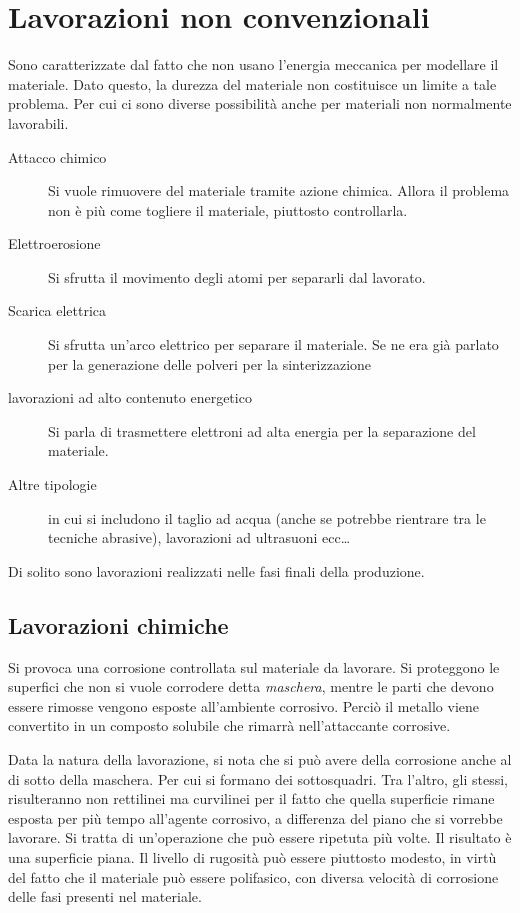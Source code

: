 \chapter{Lavorazioni non convenzionali}\label{chp:NonConvenzionale}
Sono caratterizzate dal fatto che non usano l'energia meccanica per modellare il materiale.
Dato questo, la durezza del materiale non costituisce un limite a tale problema. Per cui ci sono diverse possibilità anche per materiali non normalmente lavorabili.


\begin{description}
\item[Attacco chimico] Si vuole rimuovere del materiale tramite azione chimica. Allora il problema non è più come togliere il materiale, piuttosto controllarla.
\item[Elettroerosione] Si sfrutta il movimento degli atomi per separarli dal lavorato.
\item[Scarica elettrica] Si sfrutta un'arco elettrico per separare il materiale. Se ne era già parlato per la generazione delle polveri per la sinterizzazione
\item[lavorazioni ad alto contenuto energetico] Si parla di trasmettere elettroni ad alta energia per la separazione del materiale.
\item[Altre tipologie] in cui si includono il taglio ad acqua (anche se potrebbe rientrare tra le tecniche abrasive), lavorazioni ad ultrasuoni ecc\dots
\end{description}

Di solito sono lavorazioni realizzati nelle fasi finali della produzione.

\section{Lavorazioni chimiche}
Si provoca una corrosione controllata sul materiale da lavorare. Si proteggono le superfici che non si vuole corrodere detta \emph{maschera}, mentre le parti che devono essere rimosse vengono esposte all'ambiente corrosivo.
Perciò il metallo viene convertito in un composto solubile che rimarrà nell'attaccante corrosive.


Data la natura della lavorazione, si nota che si può avere della corrosione anche al di sotto della maschera. Per cui si formano dei sottosquadri. Tra l'altro, gli stessi, risulteranno non rettilinei ma curvilinei per il fatto che quella superficie rimane esposta per più tempo all'agente corrosivo, a differenza del piano che si vorrebbe lavorare.
Si tratta di un'operazione che può essere ripetuta più volte. Il risultato è una superficie piana.
Il livello di rugosità può essere piuttosto modesto, in virtù del fatto che il materiale può essere polifasico, con diversa velocità di corrosione delle fasi presenti nel materiale.

